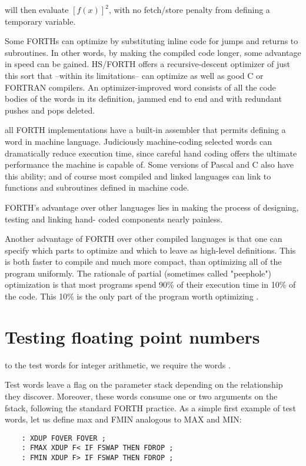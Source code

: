 will then evaluate $[f(x)]^2$, with no fetch/store penalty from defining
a temporary variable.

Some FORTHs can optimize by substituting inline code for jumps
and returns to subroutines. In other words, by making the compiled code longer,
some advantage in speed can be gained.
HS/FORTH offers a recursive-descent optimizer of just this sort
that --within its limitations-- can optimize as well as good C or
FORTRAN compilers. An optimizer-improved word consists of
all the code bodies of the words in its definition, jammed end to
end and with redundant pushes and pops deleted.

 all FORTH implementations have a built-in assembler
that permits defining a word in machine language. Judiciously
machine-coding selected words can dramatically reduce execution time, since
careful hand coding offers the ultimate performance the machine is capable of.
Some versions of Pascal and C
also have this ability; and of course most compiled and linked
languages can link to functions and subroutines defined in
machine code.

FORTH's advantage over other languages lies in making the 
process of designing, testing and linking hand- coded components
nearly painless.

Another advantage of FORTH over other compiled languages is
that one can specify which parts to optimize and which to leave
as high-level definitions. This is both faster to compile and much
more compact, than optimizing all of the program uniformly. The
rationale of partial (sometimes called "peephole") optimization
is that most programs spend 90\% of their execution time in 10\%
of the code. This 10\% is the only part of the program worth
optimizing  .

\section{Testing floating point numbers}

 to the test words for integer arithmetic, we require
the words .

Test words leave a flag on the parameter stack depending on the
relationship they discover. Moreover, these words consume one
or two arguments on the fstack, following the standard FORTH
practice. As a simple first example of test words, let us define
max and FMIN analogous to MAX and MIN: 
\begin{verbatim}
    : XDUP FOVER FOVER ;
    : FMAX XDUP F< IF FSWAP THEN FDROP ;
    : FMIN XDUP F> IF FSWAP THEN FDROP ;
\end{verbatim}

